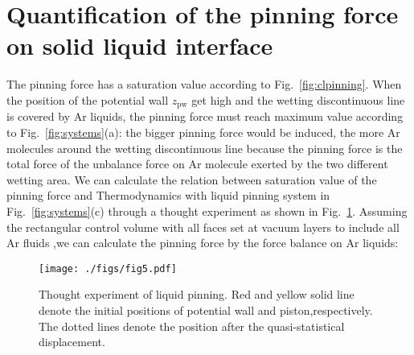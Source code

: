 \section{Quantification of the pinning force on solid liquid interface}
The pinning force has a saturation value according to Fig.~\ref{fig:clpinning}.
When the position of the potential wall $z_{\text{pw}}$ get high and the wetting discontinuous line is covered by Ar liquids,
the pinning force must reach maximum value according to Fig.~\ref{fig:systems}(a): 
the bigger pinning force would be induced, the more Ar molecules around the wetting discontinuous line 
because the pinning force is the total force of the unbalance force on Ar molecule exerted by the two different wetting area. 
We can calculate the relation between saturation value of the pinning force and Thermodynamics 
with liquid pinning system in Fig.~\ref{fig:systems}(c) 
through a thought experiment as shown in Fig.~\ref{fig:SLpin}.
Assuming the rectangular control volume with all faces set at vacuum layers to include all Ar fluids
,we can calculate the pinning force by the force balance on Ar liquids:
\begin{figure}
  \begin{center}
    \texttt{[image: ./figs/fig5.pdf]}
  \end{center} 
  \caption{\label{fig:SLpin}
    Thought experiment of liquid pinning. Red and yellow solid line denote the initial positions of potential wall and piston,respectively.
The dotted lines denote the position after the quasi-statistical displacement.
  }
\end{figure}

